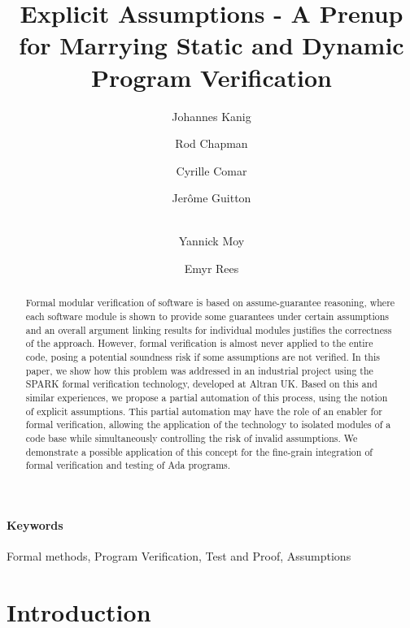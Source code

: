 \documentclass{llncs}
\newcommand{\spark}{SPARK\xspace}
\begin{document}
\title{Explicit Assumptions - A Prenup for Marrying Static and Dynamic Program Verification}

\author{Johannes Kanig \and Rod Chapman \and Cyrille Comar \and Jerôme Guitton \and \\ Yannick Moy \and Emyr Rees}

\maketitle

\begin{abstract}
Formal modular verification of software is based on assume-guarantee
reasoning, where each software module is shown to provide some guarantees
under certain assumptions and an overall argument linking results for
individual modules justifies the correctness of the approach.
However, formal verification is almost never applied to the entire code,
posing a potential soundness risk if some assumptions are not verified. In
this paper, we show how this problem was addressed in an industrial
project using the \spark formal verification technology, developed at Altran UK.
Based on this and similar experiences, we propose a partial
automation of this process, using the notion of explicit assumptions.
This partial automation may have the role of an enabler for formal
verification, allowing the application of the technology to isolated modules
of a code base while simultaneously controlling the risk of invalid
assumptions. We demonstrate a possible application of this
concept for the fine-grain integration of formal verification and testing
of Ada programs.
\end{abstract}

\paragraph{Keywords}
Formal methods, Program Verification, Test and Proof, Assumptions
\section{Introduction}
\end{document}
